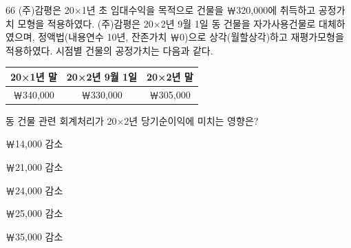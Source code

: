 \begin{question}{66}
(주)감평은 20×1년 초 임대수익을 목적으로 건물을 ￦320,000에 취득하고 공정가치 모형을 적용하였다. (주)감평은 20×2년 9월 1일 동 건물을 자가사용건물로 대체하였으며, 정액법(내용연수 10년, 잔존가치 ￦0)으로 상각(월할상각)하고 재평가모형을 적용하였다. 시점별 건물의 공정가치는 다음과 같다.
\par{\small\centering\begin{tabular}{|c|c|c|}\hline
20×1년 말 & 20×2년 9월 1일 & 20×2년 말 \\ \hline
￦340,000 & ￦330,000 & ￦305,000 \\ \hline
\end{tabular}\par}
동 건물 관련 회계처리가 20×2년 당기순이익에 미치는 영향은?
\begin{choices}
  \item ￦14,000 감소
  \item ￦21,000 감소
  \item ￦24,000 감소
  \item ￦25,000 감소
  \item ￦35,000 감소
\end{choices}
\end{question}
